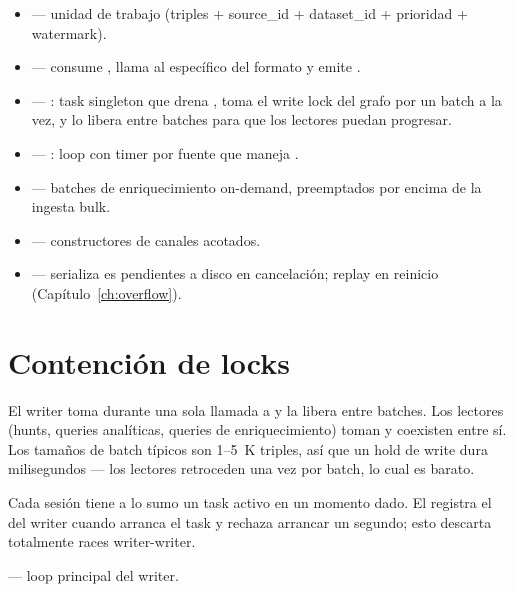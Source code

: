 \begin{itemize}
    \item {} ---
        unidad de trabajo  (triples +
        source\_id + dataset\_id + prioridad + watermark).
    \item {}
        ---  consume , llama
        al  específico del formato y emite
        .
    \item {} ---
        : task singleton que drena
        , toma el write lock del grafo por
        un batch a la vez, y lo libera entre batches para que
        los lectores puedan progresar.
    \item {}
        --- : loop con timer por fuente que
        maneja .
    \item {}
        --- batches de enriquecimiento on-demand, preemptados
        por encima de la ingesta bulk.
    \item {}
        --- constructores de canales acotados.
    \item {}
        --- serializa es pendientes a disco en
        cancelación; replay en reinicio (Capítulo~\ref{ch:overflow}).
\end{itemize}

\section{Contención de locks}

El writer toma  durante una sola llamada a
 y la libera entre batches. Los
lectores (hunts, queries analíticas, queries de enriquecimiento)
toman  y coexisten entre sí. Los tamaños de
batch típicos son 1--5~K triples, así que un hold de write dura
milisegundos --- los lectores retroceden una vez por batch, lo
cual es barato.

\begin{invariant}
Cada sesión tiene a lo sumo un task  activo en
un momento dado. El  registra el
 del writer cuando arranca el task y rechaza
arrancar un segundo; esto descarta totalmente races
writer-writer.
\end{invariant}

\begin{inthecode}
 --- loop
principal del writer.
\end{inthecode}
